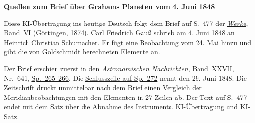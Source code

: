 \clearpage\thispagestyle{empty}
\begin{center}\textbf{Quellen zum Brief über Grahams Planeten vom 4. Juni 1848}\end{center}
\noindent Diese KI-Übertragung ins heutige Deutsch folgt dem Brief auf S.~477 der \href{https://gdz.sub.uni-goettingen.de/id/PPN236007467}{\textit{Werke}, Band~VI} (Göttingen, 1874). Carl Friedrich Gauß schrieb am 4. Juni 1848 an Heinrich Christian Schumacher. Er fügt eine Beobachtung vom 24. Mai hinzu und gibt die von Goldschmidt berechneten Elemente an.
\par\smallskip\noindent Der Brief erschien zuerst in den \textit{Astronomischen Nachrichten}, Band~XXVII, Nr.~641, \href{https://api.digitale-sammlungen.de/iiif/image/v2/bsb10049452_00141/full/1800,/0/default.jpg}{Sp.~265--266}. Die \href{https://api.digitale-sammlungen.de/iiif/image/v2/bsb10049452_00144/full/1800,/0/default.jpg}{Schlusszeile auf Sp.~272} nennt den 29. Juni 1848. Die Zeitschrift druckt unmittelbar nach dem Brief einen Vergleich der Meridianbeobachtungen mit den Elementen in 27 Zeilen ab. Der Text auf S.~477 endet mit dem Satz über die Abnahme des Instruments. KI-Übertragung und KI-Satz.
\clearpage
